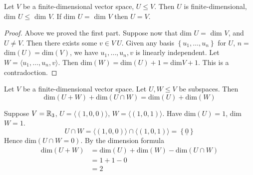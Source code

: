 \begin{prop}
	Let $V$ be a finite-dimensional vector space, $U \le V$. Then $U$ is finite-dimensional, dim $U \le $ dim $V$. If dim $U = $ dim $V$ then $U=V$.
\end{prop}
\begin{proof}
	Above we proved the first part. Suppose now that dim $U = $ dim $V$, and $U \neq V$. Then there exists some $v \in V \ U$. Given any basis $\left\{ u_1,\ldots,u_n \right\} $ for $U$, $n=$dim$\left( U \right) =$dim$\left( V \right)$, we have $ u_1,\ldots,u_n,v$ is linearly independent. Let $W = \langle u_1,\ldots,u_n,v \rangle$. Then dim$\left( W \right) =$dim$\left( U \right) +1 =$dim$V+1$. This is a contradoction.
\end{proof}

\begin{theorem}
	Let $V$ be a finite-dimensional vector space. Let $U,W \le V$ be subspaces. Then
	\[
	\text{dim}\left( U+W \right) + \text{dim}\left( U \cap W \right) = \text{dim}\left( U \right) + \text{dim}\left( W \right) 
	\] 
\end{theorem}

\begin{eg}
	Suppose $V=\mathbb{R}_3$, $U= \langle \left( 1,0,0 \right) \rangle$, $W= \langle \left( 1,0,1 \right) \rangle$. Have dim$\left( U \right) = 1$, dim$W=1$.
	\[
		U \cap W = \langle \left( 1,0,0 \right) \rangle \cap \langle \left( 1,0,1 \right) \rangle = \left\{ \underline{0} \right\}
	\] Hence dim$\left( U \cap W=0 \right) $. By the dimension formula
	\begin{align*}
		\text{dim}\left( U+W \right) &= \text{dim}\left( U \right) + \text{dim}\left( W \right) - \text{dim}\left( U \cap W \right) \\
									 &= 1+1-0\\
									 &= 2
	\end{align*} \end{eg}


